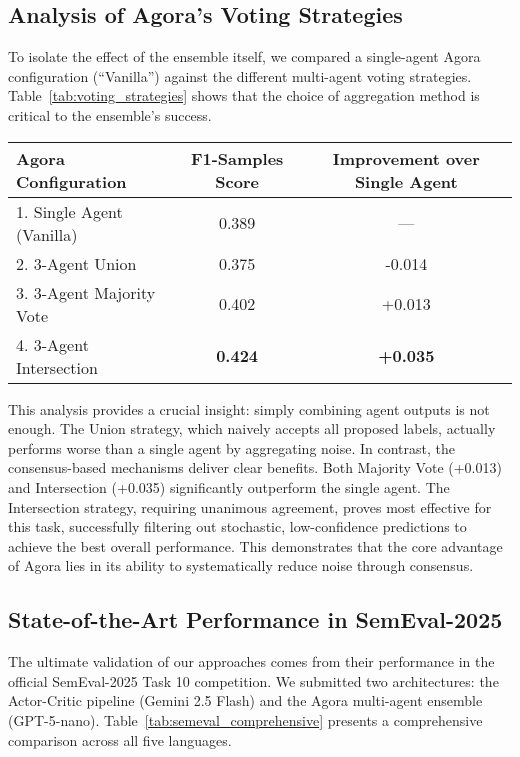 \subsection{Analysis of Agora's Voting Strategies}

To isolate the effect of the ensemble itself, we compared a single-agent Agora configuration (``Vanilla'') against the different multi-agent voting strategies. Table~\ref{tab:voting_strategies} shows that the choice of aggregation method is critical to the ensemble's success.

\begin{table*}[!ht]
\centering
\caption{Ablation of Agora Configurations on the English Dataset (F1-Samples).}
\label{tab:voting_strategies}
\begin{tabular}{lcc}
\hline
\textbf{Agora Configuration} & \textbf{F1-Samples Score} & \textbf{Improvement over Single Agent} \\
\hline
1. Single Agent (Vanilla) & 0.389 & --- \\
2. 3-Agent Union & 0.375 & -0.014 \\
3. 3-Agent Majority Vote & 0.402 & +0.013 \\
4. 3-Agent Intersection & \textbf{0.424} & \textbf{+0.035} \\
\hline
\end{tabular}
\end{table*}

This analysis provides a crucial insight: simply combining agent outputs is not enough. The Union strategy, which naively accepts all proposed labels, actually performs worse than a single agent by aggregating noise. In contrast, the consensus-based mechanisms deliver clear benefits. Both Majority Vote (+0.013) and Intersection (+0.035) significantly outperform the single agent. The Intersection strategy, requiring unanimous agreement, proves most effective for this task, successfully filtering out stochastic, low-confidence predictions to achieve the best overall performance. This demonstrates that the core advantage of Agora lies in its ability to systematically reduce noise through consensus.

\subsection{State-of-the-Art Performance in SemEval-2025}

The ultimate validation of our approaches comes from their performance in the official SemEval-2025 Task 10 competition. We submitted two architectures: the Actor-Critic pipeline (Gemini 2.5 Flash) and the Agora multi-agent ensemble (GPT-5-nano). Table~\ref{tab:semeval_comprehensive} presents a comprehensive comparison across all five languages.

